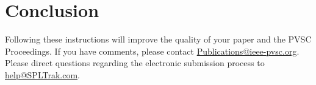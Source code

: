 \documentclass[conference]{pvsctran}
\begin{document}






\section{Conclusion}
Following these instructions will improve the quality of your paper and the PVSC Proceedings. If you have comments, please contact \url{Publications@ieee-pvsc.org}. Please direct questions regarding the electronic submission process to \url{help@SPLTrak.com}. 
\end{document}
